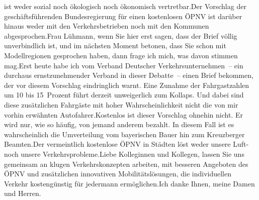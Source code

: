 \documentclass{article}
\begin{document}
ist weder sozial noch ökologisch noch ökonomisch vertretbar.Der Vorschlag der geschäftsführenden Bundesregierung für einen kostenlosen ÖPNV ist darüber hinaus weder mit den Verkehrsbetrieben noch mit den Kommunen abgesprochen.Frau Lühmann, wenn Sie hier erst sagen, dass der Brief völlig unverbindlich ist, und im nächsten Moment betonen, dass Sie schon mit Modellregionen gesprochen haben, dann frage ich mich, was davon stimmen mag.Erst heute habe ich vom Verband Deutscher Verkehrsunternehmen – ein durchaus ernstzunehmender Verband in dieser Debatte – einen Brief bekommen, der vor diesem Vorschlag eindringlich warnt. Eine Zunahme der Fahrgastzahlen um 10 bis 15 Prozent führt derzeit unweigerlich zum Kollaps. Und dabei sind diese zusätzlichen Fahrgäste mit hoher Wahrscheinlichkeit nicht die von mir vorhin erwähnten Autofahrer.Kostenlos ist dieser Vorschlag ohnehin nicht. Er wird nur, wie so häufig, von jemand anderem bezahlt. In diesem Fall ist es wahrscheinlich die Umverteilung vom bayerischen Bauer hin zum Kreuzberger Beamten.Der vermeintlich kostenlose ÖPNV in Städten löst weder unsere Luft- noch unsere Verkehrsprobleme.Liebe Kolleginnen und Kollegen, lassen Sie uns gemeinsam an klugen Verkehrskonzepten arbeiten, mit besseren Angeboten des ÖPNV und zusätzlichen innovativen Mobilitätslösungen, die individuellen Verkehr kostengünstig für jedermann ermöglichen.Ich danke Ihnen, meine Damen und Herren.
\end{document}
